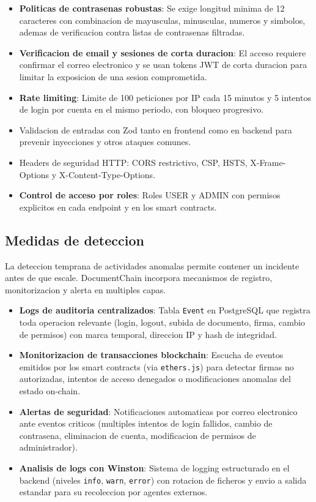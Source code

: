 \documentclass[11pt, a4paper]{article}
\begin{document}
\begin{itemize}
    \item \textbf{Politicas de contrasenas robustas}: Se exige longitud minima de 12 caracteres con combinacion de mayusculas, minusculas, numeros y simbolos, ademas de verificacion contra listas de contrasenas filtradas.
    \item \textbf{Verificacion de email y sesiones de corta duracion}: El acceso requiere confirmar el correo electronico y se usan tokens JWT de corta duracion para limitar la exposicion de una sesion comprometida.
    \item \textbf{Rate limiting}: Limite de 100 peticiones por IP cada 15 minutos y 5 intentos de login por cuenta en el mismo periodo, con bloqueo progresivo.
    \item Validacion de entradas con Zod tanto en frontend como en backend para prevenir inyecciones y otros ataques comunes.
    \item Headers de seguridad HTTP: CORS restrictivo, CSP, HSTS, X-Frame-Options y X-Content-Type-Options.
    \item \textbf{Control de acceso por roles}: Roles USER y ADMIN con permisos explicitos en cada endpoint y en los smart contracts.
\end{itemize}

\subsection{Medidas de deteccion}

La deteccion temprana de actividades anomalas permite contener un incidente antes de que escale. DocumentChain incorpora mecanismos de registro, monitorizacion y alerta en multiples capas.

\begin{itemize}
    \item \textbf{Logs de auditoria centralizados}: Tabla \texttt{Event} en PostgreSQL que registra toda operacion relevante (login, logout, subida de documento, firma, cambio de permisos) con marca temporal, direccion IP y hash de integridad.
    \item \textbf{Monitorizacion de transacciones blockchain}: Escucha de eventos emitidos por los smart contracts (via \texttt{ethers.js}) para detectar firmas no autorizadas, intentos de acceso denegados o modificaciones anomalas del estado on-chain.
    \item \textbf{Alertas de seguridad}: Notificaciones automaticas por correo electronico ante eventos criticos (multiples intentos de login fallidos, cambio de contrasena, eliminacion de cuenta, modificacion de permisos de administrador).
    \item \textbf{Analisis de logs con Winston}: Sistema de logging estructurado en el backend (niveles \texttt{info}, \texttt{warn}, \texttt{error}) con rotacion de ficheros y envio a salida estandar para su recoleccion por agentes externos.
\end{itemize}
\end{document}
